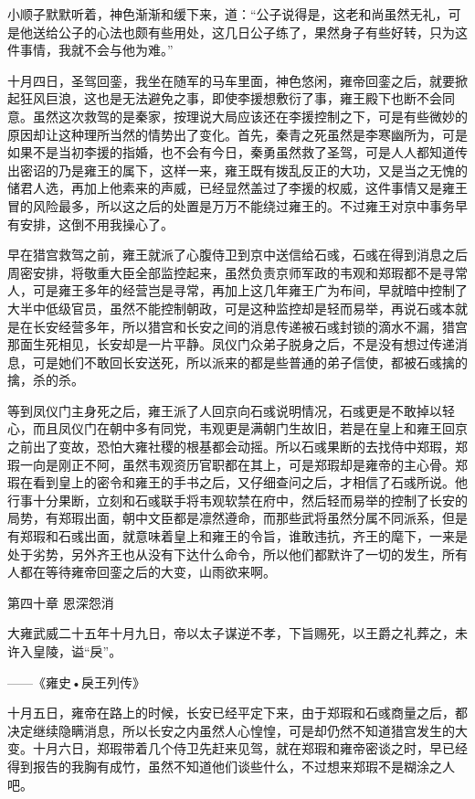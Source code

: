 小顺子默默听着，神色渐渐和缓下来，道：“公子说得是，这老和尚虽然无礼，可是他送给公子的心法也颇有些用处，这几日公子练了，果然身子有些好转，只为这件事情，我就不会与他为难。”

十月四日，圣驾回銮，我坐在随军的马车里面，神色悠闲，雍帝回銮之后，就要掀起狂风巨浪，这也是无法避免之事，即使李援想敷衍了事，雍王殿下也断不会同意。虽然这次救驾的是秦家，按理说大局应该还在李援控制之下，可是有些微妙的原因却让这种理所当然的情势出了变化。首先，秦青之死虽然是李寒幽所为，可是如果不是当初李援的指婚，也不会有今日，秦勇虽然救了圣驾，可是人人都知道传出密诏的乃是雍王的属下，这样一来，雍王既有拨乱反正的大功，又是当之无愧的储君人选，再加上他素来的声威，已经显然盖过了李援的权威，这件事情又是雍王冒的风险最多，所以这之后的处置是万万不能绕过雍王的。不过雍王对京中事务早有安排，这倒不用我操心了。

早在猎宫救驾之前，雍王就派了心腹侍卫到京中送信给石彧，石彧在得到消息之后周密安排，将敬重大臣全部监控起来，虽然负责京师军政的韦观和郑瑕都不是寻常人，可是雍王多年的经营岂是寻常，再加上这几年雍王广为布间，早就暗中控制了大半中低级官员，虽然不能控制朝政，可是这种监控却是轻而易举，再说石彧本就是在长安经营多年，所以猎宫和长安之间的消息传递被石彧封锁的滴水不漏，猎宫那面生死相见，长安却是一片平静。凤仪门众弟子脱身之后，不是没有想过传递消息，可是她们不敢回长安送死，所以派来的都是些普通的弟子信使，都被石彧擒的擒，杀的杀。

等到凤仪门主身死之后，雍王派了人回京向石彧说明情况，石彧更是不敢掉以轻心，而且凤仪门在朝中多有同党，韦观更是满朝门生故旧，若是在皇上和雍王回京之前出了变故，恐怕大雍社稷的根基都会动摇。所以石彧果断的去找侍中郑瑕，郑瑕一向是刚正不阿，虽然韦观资历官职都在其上，可是郑瑕却是雍帝的主心骨。郑瑕在看到皇上的密令和雍王的手书之后，又仔细查问之后，才相信了石彧所说。他行事十分果断，立刻和石彧联手将韦观软禁在府中，然后轻而易举的控制了长安的局势，有郑瑕出面，朝中文臣都是凛然遵命，而那些武将虽然分属不同派系，但是有郑瑕和石彧出面，就意味着皇上和雍王的令旨，谁敢违抗，齐王的麾下，一来是处于劣势，另外齐王也从没有下达什么命令，所以他们都默许了一切的发生，所有人都在等待雍帝回銮之后的大变，山雨欲来啊。

第四十章    恩深怨消

大雍武威二十五年十月九日，帝以太子谋逆不孝，下旨赐死，以王爵之礼葬之，未许入皇陵，谥“戾”。

——《雍史•戾王列传》

十月五日，雍帝在路上的时候，长安已经平定下来，由于郑瑕和石彧商量之后，都决定继续隐瞒消息，所以长安之内虽然人心惶惶，可是却仍然不知道猎宫发生的大变。十月六日，郑瑕带着几个侍卫先赶来见驾，就在郑瑕和雍帝密谈之时，早已经得到报告的我胸有成竹，虽然不知道他们谈些什么，不过想来郑瑕不是糊涂之人吧。

